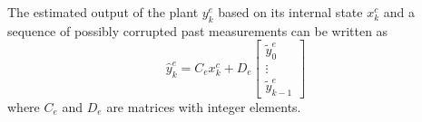 \documentclass[journal, twoside, web]{ieeecolorpreprint}
\newtheorem{asm}{Assumption}
\begin{document}
The estimated output of the plant $y^e_k$ based on its internal state $x_k^c$ and a sequence of possibly corrupted past measurements can be written as
\begin{equation}\label{eq:controller_estimates_output}
         \hat{y}^e_k = C_ex_k^c+D_e\begin{bmatrix}
        \tilde y_0^e \\ \vdots \\ \tilde y_{k-1}^e
    \end{bmatrix}
    \end{equation}
where $C_e$ and $D_e$ are matrices with integer elements.%
\end{document}
